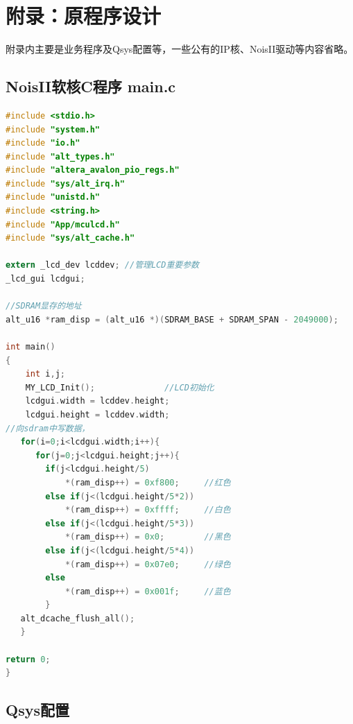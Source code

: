 \documentclass[12pt,hyperref,a4paper,UTF8]{ctexart}
\begin{document}
\section{附录：原程序设计}

附录内主要是业务程序及Qsys配置等，一些公有的IP核、NoisII驱动等内容省略。
\subsection{NoisII软核C程序 main.c}

\begin{lstlisting}[language=C]
#include <stdio.h>
#include "system.h"
#include "io.h"
#include "alt_types.h"
#include "altera_avalon_pio_regs.h"
#include "sys/alt_irq.h"
#include "unistd.h"
#include <string.h>
#include "App/mculcd.h"
#include "sys/alt_cache.h"

extern _lcd_dev lcddev;	//管理LCD重要参数
_lcd_gui lcdgui;

//SDRAM显存的地址
alt_u16 *ram_disp = (alt_u16 *)(SDRAM_BASE + SDRAM_SPAN - 2049000);

int main()
{
    int i,j;
    MY_LCD_Init();              //LCD初始化
    lcdgui.width = lcddev.height;
    lcdgui.height = lcddev.width;
//向sdram中写数据，
   for(i=0;i<lcdgui.width;i++){
      for(j=0;j<lcdgui.height;j++){
        if(j<lcdgui.height/5)
            *(ram_disp++) = 0xf800;     //红色
        else if(j<(lcdgui.height/5*2))
        	*(ram_disp++) = 0xffff;     //白色
        else if(j<(lcdgui.height/5*3))
        	*(ram_disp++) = 0x0;        //黑色
        else if(j<(lcdgui.height/5*4))
            *(ram_disp++) = 0x07e0;     //绿色
        else
            *(ram_disp++) = 0x001f;     //蓝色
        }
   alt_dcache_flush_all();
   }

return 0;
}
\end{lstlisting}

\subsection{Qsys配置}
\end{document}
